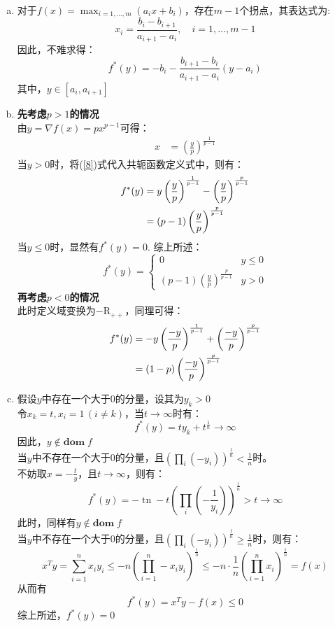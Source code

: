 \documentclass[10pt, a4paper]{article}
\begin{document}
\begin{enumerate}[(a)]
	\item 对于$f(x)=\max _{i=1, \ldots, m}(a_{i} x+b_{i})$，存在$m-1$个拐点，其表达式为:
    \[x_{i}=\frac{b_{i}-b_{i+1}}{a_{i+1}-a_{i}}, \quad i=1, \ldots, m-1\]
    因此，不难求得：
    \[f^{*}(y)=-b_{i}-\frac{b_{i+1}-b_{i}}{a_{i+1}-a_{i}}\left(y-a_{i}\right)\]
    其中，$y \in\left[a_{i}, a_{i+1}\right]$

	\item \textbf{先考虑$p>1$的情况}\\
    由$y=\nabla f(x)=p x^{p-1} $可得：
    \begin{align}
        x & = \left(\frac{y}{p}\right)^{\frac{1}{p-1}} \label{8}
    \end{align}
    当$y>0$时，将(\ref*{8})式代入共轭函数定义式中，则有：
    \begin{align}
        f^{*}(y) & = y\left(\frac{y}{p}\right)^{\frac{1}{p-1}}-\left(\frac{y}{p}\right)^{\frac{p}{p-1}} \notag \\
        & = (p-1)\left(\frac{y}{p}\right)^{\frac{p}{p-1}} \notag
    \end{align}
    当$y\le 0$时，显然有$f^{*}(y)=0$.
    综上所述：
    \[f^{*}(y)=\left\{\begin{array}{ll}
        0 & y \leq 0 \\
        (p-1)\left(\frac{y}{p}\right)^{\frac{p}{p-1}} & y>0
        \end{array}\right.\]
    \textbf{再考虑$p<0$的情况}\\
    此时定义域变换为$-\mathrm {R}_{++} $，同理可得：
    \begin{align}
        f^{*}(y) & = -y\left(\frac{-y}{p}\right)^{\frac{1}{p-1}}+\left(\frac{-y}{p}\right)^{\frac{p}{p-1}} \notag \\
        & = (1-p)\left(\frac{-y}{p}\right)^{\frac{p}{p-1}}  \notag
    \end{align}

    \item 假设$y$中存在一个大于0的分量，设其为$y_{k}>0$\\
    令$x_{k}=t,x_{i}=1\,(i\neq k)$，当$t \to \infty$时有：
    \[f^{*}(y)=t y_{k}+t^{\frac{1}{n}} \to \infty\]
    因此，$y\notin \textbf{dom}\; f$\\
    当$y$中不存在一个大于0的分量，且$\left(\prod_{i}\left(-y_{i}\right)\right)^{\frac{1}{n} }<\frac{1}{n} $时。\\
    不妨取$x=-\frac{t}{y}$，且$t \to \infty$，则有：
    \[f^{*}(y)=-\operatorname{tn}-t\left(\prod_{i}\left(-\frac{1}{y_{i}}\right)\right)^{\frac{1}{n}}>t \rightarrow \infty\]
    此时，同样有$y\notin \textbf{dom}\; f$\\
    当$y$中不存在一个大于0的分量，且$\left(\prod_{i}\left(-y_{i}\right)\right)^{\frac{1}{n} }\ge \frac{1}{n} $时，则有：
    \[x^{T} y=\sum_{i=1}^{n} x_{i} y_{i} \leq-n\left(\prod_{i=1}^{n}-x_{i} y_{i}\right)^{\frac{1}{n}} \leq-n \cdot  \frac{1}{n}\left(\prod_{i=1}^{n} x_{i}\right)^{\frac{1}{n}}=f(x)\]
    从而有
    \[f^{*}(y)=x^{T} y-f(x) \leq 0\]
    综上所述，$f^{*}(y)=0$


\end{enumerate}
\end{document}
